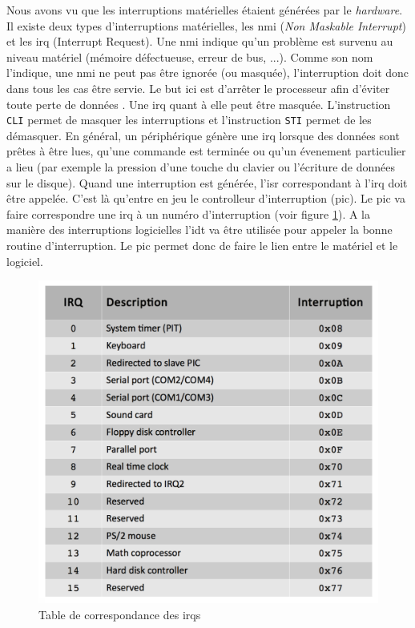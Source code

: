 Nous avons vu que les interruptions matérielles étaient générées par le \textit{hardware}.
Il existe deux types d'interruptions matérielles, les \acrshort{nmi} (\textit{Non Maskable
Interrupt}) et les \acrshort{irq} (Interrupt Request). Une \acrshort{nmi} indique
qu'un problème est survenu au niveau matériel (mémoire défectueuse, erreur de bus, ...).
Comme son nom l'indique, une \acrshort{nmi} ne peut pas être ignorée (ou masquée),
l'interruption doit donc dans tous les cas être servie. Le but ici est d'arrêter
le processeur afin d'éviter toute perte de données \cite{ref42}. Une \acrshort{irq}
quant à elle peut être masquée. L'instruction \texttt{CLI} permet de masquer
les interruptions et l'instruction \texttt{STI} permet de les démasquer.
En général, un périphérique génère une \acrshort{irq} lorsque des données sont
prêtes à être lues, qu'une commande est terminée ou qu'un évenement particulier
a lieu (par exemple la pression d'une touche du clavier ou l'écriture de données
sur le disque). Quand une interruption est générée, l'\acrshort{isr} correspondant
à l'\acrshort{irq} doit être appelée. C'est là qu'entre en jeu le controlleur
d'interruption (\acrshort{pic}). Le \acrshort{pic} va faire correspondre une
\acrshort{irq} à un numéro d'interruption (voir figure \ref{irqs}). A la manière des
interruptions logicielles l'\acrshort{idt} va être utilisée pour appeler la bonne
routine d'interruption. Le \acrshort{pic} permet donc de faire le lien entre le
matériel et le logiciel. \\

\begin{figure}[!h]
  \centering
  \includegraphics[scale=0.5]{images/irqs.png}
  \caption{Table de correspondance des \acrshort{irq}s}
  \label{irqs}
\end{figure}

